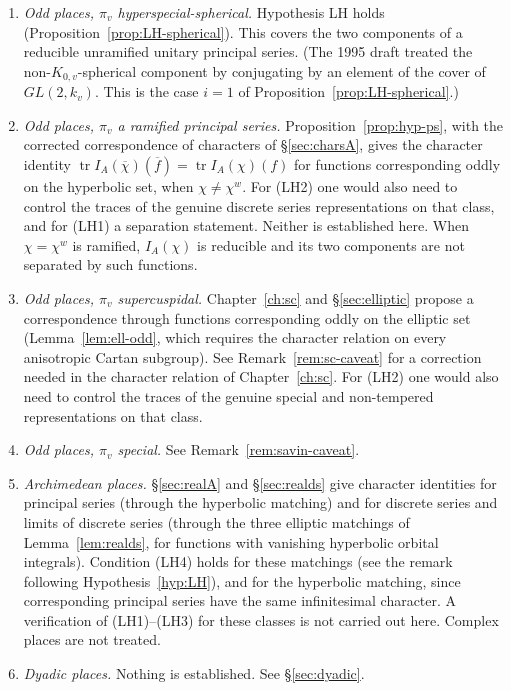 \documentclass[12pt,letterpaper]{book}
\theoremstyle{plain}
\theoremstyle{definition}
\theoremstyle{remark}
\theoremstyle{remark}
\newcommand{\tr}{\operatorname{tr}}
\begin{document}
\begin{enumerate}
\item {\em Odd places, $\pi_v$ hyperspecial-spherical.} Hypothesis LH
holds (Proposition~\ref{prop:LH-spherical}). This covers the two
components of a reducible unramified unitary principal series. (The
1995 draft treated the non-$K_{0,v}$-spherical component by conjugating
by an element of the cover of $GL(2,k_v)$. This is the case $i=1$ of
Proposition~\ref{prop:LH-spherical}.)

\item {\em Odd places, $\pi_v$ a ramified principal series.}
Proposition~\ref{prop:hyp-ps}, with the corrected correspondence of
characters of \S\ref{sec:charsA}, gives the character identity
$\tr I_A(\overline{\chi})(\overline{f})=\tr I_A(\chi)(f)$ for
functions corresponding oddly on the hyperbolic set, when
$\chi\neq\chi^w$. For (LH2) one would also need to control the traces of
the genuine discrete series representations on that class, and for
(LH1) a separation statement. Neither is established here.
When $\chi=\chi^w$ is ramified, $I_A(\chi)$ is reducible and its two
components are not separated by such functions.

\item {\em Odd places, $\pi_v$ supercuspidal.} Chapter~\ref{ch:sc} and
\S\ref{sec:elliptic} propose a correspondence through functions
corresponding oddly on the elliptic set (Lemma~\ref{lem:ell-odd}, which
requires the character relation on every anisotropic Cartan subgroup).
See Remark~\ref{rem:sc-caveat} for a correction needed in the character
relation of Chapter~\ref{ch:sc}. For (LH2) one would also need to
control the traces of the genuine special and non-tempered
representations on that class.

\item {\em Odd places, $\pi_v$ special.} See
Remark~\ref{rem:savin-caveat}.

\item {\em Archimedean places.} \S\ref{sec:realA} and
\S\ref{sec:realds} give character identities for principal series
(through the hyperbolic matching) and for discrete series and limits of
discrete series (through the three elliptic matchings of
Lemma~\ref{lem:realds}, for functions with vanishing hyperbolic orbital
integrals). Condition (LH4) holds for these matchings (see the remark
following Hypothesis~\ref{hyp:LH}), and for the hyperbolic matching,
since corresponding principal series have the same infinitesimal
character. A verification of (LH1)--(LH3) for these classes is not
carried out here. Complex places are not treated.

\item {\em Dyadic places.} Nothing is established. See
\S\ref{sec:dyadic}.
\end{enumerate}
\end{document}
